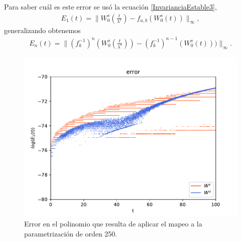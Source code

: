 \documentclass[11pt]{beamer}
\theoremstyle{definition}
\begin{document}
\begin{frame}
Para saber cuál es este error se usó la ecuación \eqref{InvarianciaEstable3},
\begin{eqnarray}
E_{1}(t)=\bigg\| W_{0}^{s}\left(\frac{t}{\lambda^{s}}\right)-f_{a,b}(W_{0}^{s}(t))\bigg\|_{\infty},
\label{error-1aplicacion}
\end{eqnarray}
generalizando obtenemos
\begin{eqnarray}
E_{n}(t)=\bigg\| (f^{-1}_{k})^{n}\left(W_{0}^{s}\left(\frac{t}{\lambda^{s}}\right)\right)- (f^{-1}_{k})^{n-1}(W_{0}^{s}(t)))\bigg\|_{\infty}.
\label{error-n-aplicacion}
\end{eqnarray}
\end{frame}
\begin{frame}
\begin{figure}[h!]
\centering
\includegraphics[scale=0.6]{error1ite.pdf}
\caption{Error en el polinomio que resulta de aplicar el mapeo a la parametrización de orden 250.}
\label{error-1iteracion}
\end{figure}
\end{frame}
\end{document}
